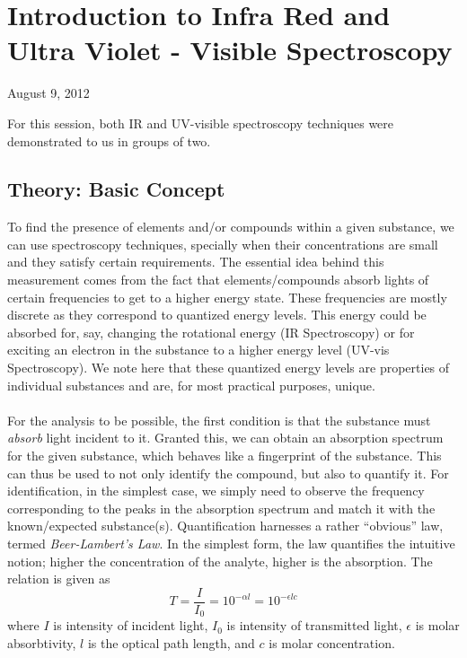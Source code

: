 \chapter{Introduction to Infra Red and Ultra Violet - Visible Spectroscopy}
\begin{flushright}
August 9, 2012
\end{flushright}

For this session, both IR and UV-visible spectroscopy techniques were demonstrated to us in groups of two.

\section{Theory: Basic Concept}
To find the presence of elements and/or compounds within a given substance, we can use spectroscopy techniques, specially when their concentrations are small and they satisfy certain requirements. The essential idea behind this measurement comes from the fact that elements/compounds absorb lights of certain frequencies to get to a higher energy state. These frequencies are mostly discrete as they correspond to quantized energy levels. This energy could be absorbed for, say, changing the rotational energy (IR Spectroscopy) or for exciting an electron in the substance to a higher energy level (UV-vis Spectroscopy). We note here that these quantized energy levels are properties of individual substances and are, for most practical purposes, unique.\\
 \\
For the analysis to be possible, the first condition is that the substance must \emph{absorb} light incident to it.  Granted this, we can obtain an absorption spectrum for the given substance, which behaves like a fingerprint of the substance. This can thus be used to not only identify the compound, but also to quantify it. For identification, in the simplest case, we simply need to observe the frequency corresponding to the peaks in the absorption spectrum and match it with the known/expected substance(s). Quantification harnesses a rather ``obvious'' law, termed \emph{Beer-Lambert's Law}. In the simplest form, the law quantifies the intuitive notion; higher the concentration of the analyte, higher is the absorption. The relation is given as
\begin{equation}
T=\frac{I}{I_{0}}=10^{-\alpha l}=10^{- \epsilon l c}
\label{beerlambertslaw}
\end{equation}
where $I$ is intensity of incident light, $I_{0}$ is intensity of transmitted light, $\epsilon$ is molar absorbtivity, $l$ is the optical path length, and $c$ is molar concentration.

